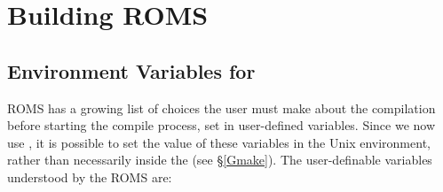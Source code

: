 \section{Building ROMS}

\subsection{Environment Variables for }
\label{make_var}

ROMS has a growing list of choices the user must make about the
compilation before starting the compile process,
set in user-defined variables. Since we now use , it is
possible to set the value of these variables in the Unix environment,
rather than necessarily inside the  (see \S\ref{Gmake}).
The user-definable variables understood by the ROMS  are:
